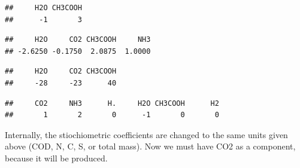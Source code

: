 \documentclass[
]{article}
\newenvironment{Shaded}{\begin{snugshade}}{\end{snugshade}}
\newcommand{\DecValTok}[1]{\textcolor[rgb]{0.00,0.00,0.81}{#1}}
\newcommand{\FunctionTok}[1]{\textcolor[rgb]{0.13,0.29,0.53}{\textbf{#1}}}
\newcommand{\NormalTok}[1]{#1}
\newcommand{\SpecialCharTok}[1]{\textcolor[rgb]{0.81,0.36,0.00}{\textbf{#1}}}
\begin{document}
\begin{Shaded}
\end{Shaded}

\begin{verbatim}
##     H2O CH3COOH 
##      -1       3
\end{verbatim}

\begin{Shaded}
\end{Shaded}

\begin{verbatim}
##     H2O     CO2 CH3COOH     NH3 
## -2.6250 -0.1750  2.0875  1.0000
\end{verbatim}

\begin{Shaded}
\end{Shaded}

\begin{verbatim}
##     H2O     CO2 CH3COOH 
##     -28     -23      40
\end{verbatim}

\begin{Shaded}
\end{Shaded}

\begin{verbatim}
##     CO2     NH3      H.     H2O CH3COOH      H2 
##       1       2       0      -1       0       0
\end{verbatim}

Internally, the stiochiometric coefficients are changed to the same
units given above (COD, N, C, S, or total mass). Now we must have CO2 as
a component, because it will be produced.
\end{document}
